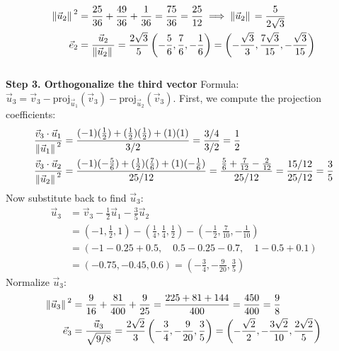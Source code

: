 \documentclass{article}
\begin{document}
\begin{align*}
	\norm*{\vec{u}_{2}}^2 & = \frac{25}{36} + \frac{49}{36} + \frac{1}{36} = \frac{75}{36} = \frac{25}{12} \implies \norm*{\vec{u}_{2}} = \frac{5}{2\sqrt{3}}                                                                  \\
	\vec{e}_{2}           & = \frac{\vec{u}_{2}}{\norm*{\vec{u}_{2}}} = \frac{2\sqrt{3}}{5}\left(-\frac{5}{6}, \frac{7}{6}, -\frac{1}{6}\right) = \left(-\frac{\sqrt{3}}{3}, \frac{7\sqrt{3}}{15}, -\frac{\sqrt{3}}{15}\right)
\end{align*}
\\
\textbf{Step 3. Orthogonalize the third vector}
Formula: $\vec{u}_{3} = \vec{v}_{3} - \text{proj}_{\vec{u}_{1}}(\vec{v}_{3}) - \text{proj}_{\vec{u}_{2}}(\vec{v}_{3})$.
First, we compute the projection coefficients:
\begin{align*}
	\frac{\vec{v}_{3} \cdot \vec{u}_{1}}{\norm*{\vec{u}_{1}}^2} & = \frac{(-1)(\frac{1}{2}) + (\frac{1}{2})(\frac{1}{2}) + (1)(1)}{3/2} = \frac{3/4}{3/2} = \frac{1}{2}                                                                             \\
	\frac{\vec{v}_{3} \cdot \vec{u}_{2}}{\norm*{\vec{u}_{2}}^2} & = \frac{(-1)(-\frac{5}{6}) + (\frac{1}{2})(\frac{7}{6}) + (1)(-\frac{1}{6})}{25/12} = \frac{\frac{5}{6} + \frac{7}{12} - \frac{2}{12}}{25/12} = \frac{15/12}{25/12} = \frac{3}{5}
\end{align*}
Now substitute back to find $\vec{u}_{3}$:
\begin{align*}
	\vec{u}_{3} & = \vec{v}_{3} - \frac{1}{2}\vec{u}_{1} - \frac{3}{5}\vec{u}_{2}                                                                                 \\
	            & = \left(-1, \frac{1}{2}, 1\right) - \left(\frac{1}{4}, \frac{1}{4}, \frac{1}{2}\right) - \left(-\frac{1}{2}, \frac{7}{10}, -\frac{1}{10}\right) \\
	            & = \left( -1 - 0.25 + 0.5, \quad 0.5 - 0.25 - 0.7, \quad 1 - 0.5 + 0.1 \right)                                                                   \\
	            & = \left( -0.75, -0.45, 0.6 \right) = \left( -\frac{3}{4}, -\frac{9}{20}, \frac{3}{5} \right)
\end{align*}
Normalize $\vec{u}_{3}$:
\begin{align*}
	\norm*{\vec{u}_{3}}^2 & = \frac{9}{16} + \frac{81}{400} + \frac{9}{25} = \frac{225 + 81 + 144}{400} = \frac{450}{400} = \frac{9}{8}    \\
	\vec{e}_{3}           & = \frac{\vec{u}_{3}}{\sqrt{9/8}} = \frac{2\sqrt{2}}{3} \left( -\frac{3}{4}, -\frac{9}{20}, \frac{3}{5} \right)
	= \left( -\frac{\sqrt{2}}{2}, -\frac{3\sqrt{2}}{10}, \frac{2\sqrt{2}}{5} \right)
\end{align*}
\end{document}
